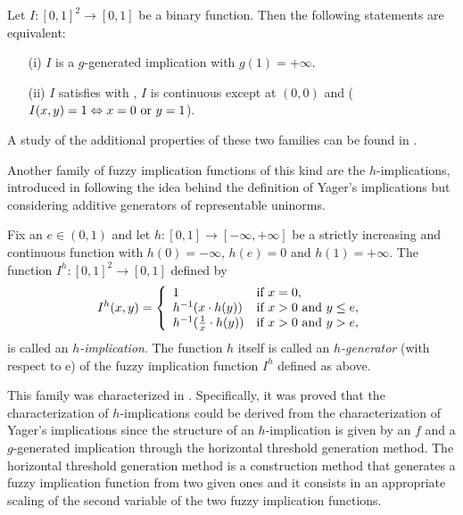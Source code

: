\begin{theorem} 
	\label{thm:Char_G_Inf}
	Let $I:[0,1]^2\to [0,1]$ be a binary function. Then the following statements are equivalent:
	\begin{enumerate}
		\item[(i)] $I$ is a $g$-generated implication with $g(1)=+\infty$.
		\item[(ii)] $I$ satisfies \LI with \TP, $I$ is continuous except at $(0,0)$ and ($I(x,y)=1 \Leftrightarrow x=0 \hbox{ or } y=1$). 
	\end{enumerate}
\end{theorem}

A study of the additional properties of these two families can be found in \cite[Chapter 3]{Baczynski2008}.


Another family of fuzzy implication functions of this kind are the $h$-implications, introduced in \cite{Massanet2011A} following the idea behind the definition of Yager's implications but considering additive generators of representable uninorms.
\begin{definition}\label{Defhimpl} Fix an $e \in (0,1)$ and let $h:[0,1] \to [-\infty,+\infty]$ be a strictly increasing and continuous function with $h(0)=-\infty$, $h(e)=0$ and $h(1)=+\infty$. The function $I^h:[0,1]^2 \to [0,1]$ defined by
	$$I^h(x,y)=\left \{\begin{array}{ll} 1& \hbox{if } x=0,\\
		h^{-1}(x\cdot h(y))&\hbox{if } x>0 \hbox{ and } y \leq e, \\
		h^{-1}(\frac{1}{x}\cdot h(y))&\hbox{if } x>0 \hbox{ and } y > e,
	\end{array}\right.
	$$
	is called an \emph{$h$-implication}. The function $h$ itself is called an \emph{$h$-generator} (with respect to e) of the fuzzy implication function $I^h$ defined as above.
\end{definition}

This family was characterized in \cite{Massanet2012A}. Specifically, it was proved that the characterization of $h$-implications could be derived from the characterization of Yager's implications since the structure of an $h$-implication is given by an $f$ and a $g$-generated implication through the horizontal threshold generation method. The horizontal threshold generation method is a construction method that generates a fuzzy implication function from two given ones and it consists in an appropriate scaling of the second variable of the two fuzzy implication functions.

